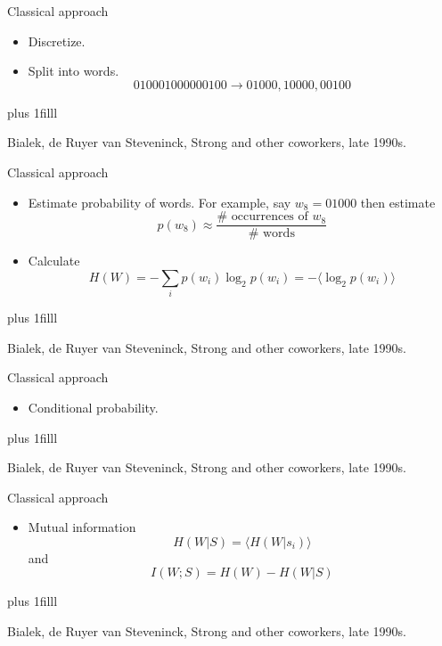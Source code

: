 \documentclass{beamer}
\newcommand{\btVFill}{\vskip0pt plus 1filll}
\begin{document}
\begin{frame}{Classical approach}
\begin{itemize}
\item Discretize.
\color{reddish}
\begin{center}

\end{center}
\color{black}
\item Split into words.
\color{dark}
$$010001000000100\rightarrow 01000,10000,00100$$
\color{black}
\end{itemize}
\btVFill
\begin{flushright}
\tiny{Bialek, de Ruyer van Steveninck, Strong and other coworkers, late 1990s.}
\end{flushright}
\end{frame}

\begin{frame}{Classical approach}
\begin{itemize}
\item Estimate probability of words. For example, say $w_8=01000$ then estimate
\color{dark}
$$p(w_8)\approx\frac{\#\mbox{ occurrences of }w_8}{\#\mbox{ words}}$$ 
\color{black}
\item Calculate
\color{dark}
$$H(W)=-\sum_i p(w_i)\log_2 p(w_i) =-\langle\log_2 p(w_i)\rangle$$ 
\color{black}
\end{itemize}
\btVFill
\begin{flushright}
\tiny{Bialek, de Ruyer van Steveninck, Strong and other coworkers, late 1990s.}
\end{flushright}
\end{frame}


\begin{frame}{Classical approach}
\begin{itemize}
\item Conditional probability.
\color{reddish}
\begin{center}

\end{center}
\color{black}
\end{itemize}
\btVFill
\begin{flushright}
\tiny{Bialek, de Ruyer van Steveninck, Strong and other coworkers, late 1990s.}
\end{flushright}
\end{frame}


\begin{frame}{Classical approach}
\begin{itemize}
\item Mutual information
\color{dark}
$$H(W|S)=\langle H(W|s_i)\rangle$$
\color{black}
and
\color{dark}
$$I(W;S)=H(W)-H(W|S)$$
\color{black}
\end{itemize}
\btVFill
\begin{flushright}
\color{gray}
  \tiny{Bialek, de Ruyer van Steveninck, Strong and other coworkers, late 1990s.}
\end{flushright}
\color{black}
\end{frame}
\end{document}
